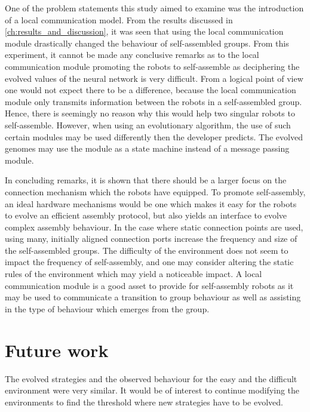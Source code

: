 One of the problem statements this study aimed to examine was the introduction of a local communication model. From the results discussed in \ref{ch:results_and_discussion}, it was seen that using the local communication module drastically changed the behaviour of self-assembled groups. 
From this experiment, it cannot be made any conclusive remarks as to the local communication module promoting the robots to self-assemble as deciphering the evolved values of the neural network is very difficult.
From a logical point of view one would not expect there to be a difference, because the local communication module only transmits information between the robots in a self-assembled group. 
Hence, there is seemingly no reason why this would help two singular robots to self-assemble.
However, when using an evolutionary algorithm, the use of such certain modules may be used differently then the developer predicts.
The evolved genomes may use the module as a state machine instead of a message passing module.

In concluding remarks, it is shown that there should be a larger focus on the connection mechanism which the robots have equipped.
To promote self-assembly, an ideal hardware mechanisms would be one which makes it easy for the robots to evolve an efficient assembly protocol, but also yields an interface to evolve complex assembly behaviour.
In the case where static connection points are used, using many, initially aligned connection ports increase the frequency and size of the self-assembled groups.
The difficulty of the environment does not seem to impact the frequency of self-assembly, and one may consider altering the static rules of the environment which may yield a noticeable impact.
A local communication module is a good asset to provide for self-assembly robots as it may be used to communicate a transition to group behaviour as well as assisting in the type of behaviour which emerges from the group. 
  


\section{Future work}
The evolved strategies and the observed behaviour for the easy and the difficult environment were very similar.
It would be of interest to continue modifying the environments to find the threshold where new strategies have to be evolved. 